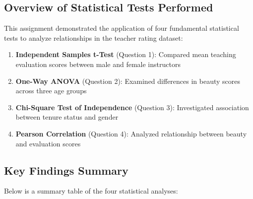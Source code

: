 \documentclass[11pt]{article}
\providecommand{\tightlist}{%
      \setlength{\itemsep}{0pt}\setlength{\parskip}{0pt}}
\begin{document}
\subsection{Overview of Statistical Tests
Performed}\label{overview-of-statistical-tests-performed}

This assignment demonstrated the application of four fundamental
statistical tests to analyze relationships in the teacher rating
dataset:

\begin{enumerate}
\def\labelenumi{\arabic{enumi}.}
\tightlist
\item
  \textbf{Independent Samples t-Test} (Question 1): Compared mean
  teaching evaluation scores between male and female instructors
\item
  \textbf{One-Way ANOVA} (Question 2): Examined differences in beauty
  scores across three age groups
\item
  \textbf{Chi-Square Test of Independence} (Question 3): Investigated
  association between tenure status and gender
\item
  \textbf{Pearson Correlation} (Question 4): Analyzed relationship
  between beauty and evaluation scores
\end{enumerate}

\subsection{Key Findings Summary}\label{key-findings-summary}

Below is a summary table of the four statistical analyses:
\end{document}
